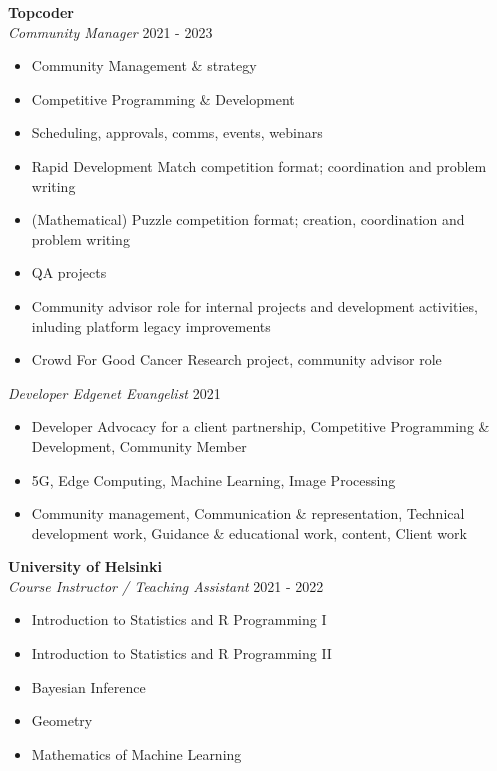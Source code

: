 \documentclass[margin, 10pt]{res} %
\begin{document}
\begin{resume}
  
 \textbf{Topcoder}\\
 {\sl Community Manager} \hfill 2021 - 2023 \\
 \begin{itemize}
 	\item Community Management \& strategy
 	\item Competitive Programming \& Development
 	\item Scheduling, approvals, comms, events, webinars
 	\item Rapid Development Match competition format; coordination and problem writing
 	\item (Mathematical) Puzzle competition format; creation, coordination and problem writing
 	\item QA projects
 	\item Community advisor role for internal projects and development activities, inluding platform legacy improvements
 	\item Crowd For Good Cancer Research project, community advisor role
 \end{itemize}
 {\sl Developer Edgenet Evangelist} \hfill 2021 
 \begin{itemize} \itemsep -2pt %
 	\item Developer Advocacy for a client partnership, Competitive Programming \& \\ Development, Community Member
 	\item 5G, Edge Computing, Machine Learning, Image Processing
 	\item Community management, Communication \& representation, Technical development work, Guidance \& educational work, content, Client work
 \end{itemize}

\textbf{University of Helsinki}\\
{\sl Course Instructor / Teaching Assistant} \hfill 2021 - 2022  \\
\begin{itemize}
	\item Introduction to Statistics and R Programming I
	\item Introduction to Statistics and R Programming II
	\item Bayesian Inference
	\item Geometry
	\item Mathematics of Machine Learning
\end{itemize}
  

\end{resume}
\end{document}
